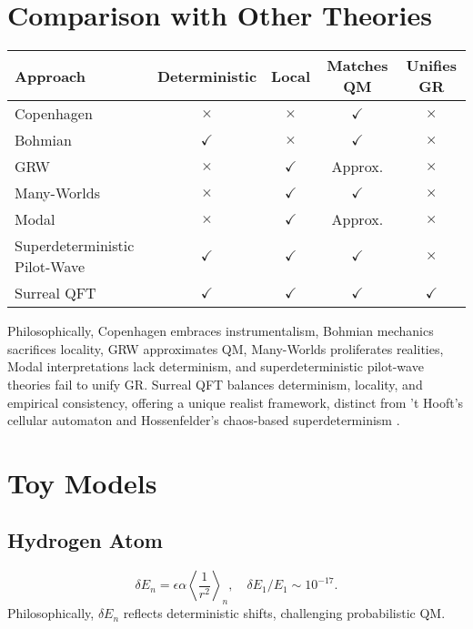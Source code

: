 \documentclass{article}
\begin{document}
\section{Comparison with Other Theories}
\begin{center}
\begin{tabular}{lcccc}
\hline
\textbf{Approach} & \textbf{Deterministic} & \textbf{Local} & \textbf{Matches QM} & \textbf{Unifies GR} \\
\hline
Copenhagen & $\times$ & $\times$ & $\checkmark$ & $\times$ \\
Bohmian & $\checkmark$ & $\times$ & $\checkmark$ & $\times$ \\
GRW & $\times$ & $\checkmark$ & Approx. & $\times$ \\
Many-Worlds & $\times$ & $\checkmark$ & $\checkmark$ & $\times$ \\
Modal & $\times$ & $\checkmark$ & Approx. & $\times$ \\
Superdeterministic Pilot-Wave & $\checkmark$ & $\checkmark$ & $\checkmark$ & $\times$ \\
Surreal QFT & $\checkmark$ & $\checkmark$ & $\checkmark$ & $\checkmark$ \\
\hline
\end{tabular}
\end{center}
Philosophically, Copenhagen embraces instrumentalism, Bohmian mechanics sacrifices locality, GRW approximates QM, Many-Worlds proliferates realities, Modal interpretations lack determinism, and superdeterministic pilot-wave theories fail to unify GR. Surreal QFT balances determinism, locality, and empirical consistency, offering a unique realist framework, distinct from 't Hooft's cellular automaton \cite{tHooft2014} and Hossenfelder's chaos-based superdeterminism \cite{Hossenfelder2020}.

\section{Toy Models}
\subsection{Hydrogen Atom}
\begin{equation}
\delta E_n = \epsilon \alpha \left\langle \frac{1}{r^2} \right\rangle_n, \quad \delta E_1 / E_1 \sim 10^{-17}.
\end{equation}
Philosophically, \(\delta E_n\) reflects deterministic shifts, challenging probabilistic QM.
\end{document}
